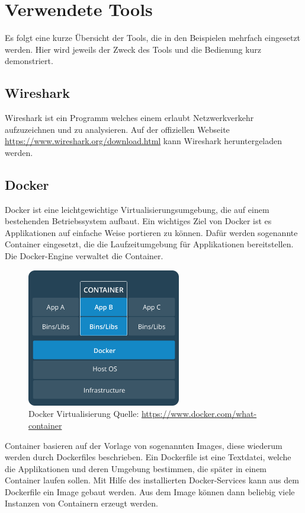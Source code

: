 \chapter{Verwendete Tools}
Es folgt eine kurze Übersicht der Tools, die in den Beispielen mehrfach eingesetzt werden. Hier wird jeweils der Zweck des Tools und die Bedienung kurz demonstriert.


\section{Wireshark}

Wireshark ist ein Programm welches einem erlaubt Netzwerkverkehr aufzuzeichnen und zu analysieren.
Auf der offiziellen Webseite \url{https://www.wireshark.org/download.html} kann Wireshark heruntergeladen werden.

\section{Docker}
Docker ist eine leichtgewichtige Virtualisierungsumgebung, die auf einem bestehenden Betriebssystem aufbaut. Ein wichtiges Ziel von Docker ist es Applikationen auf einfache Weise portieren zu können. Dafür werden sogenannte Container eingesetzt, die die Laufzeitumgebung für Applikationen bereitstellen. Die Docker-Engine verwaltet die Container.

\begin{figure}[H]
	\centering
    \includegraphics[width=0.6\textwidth]{images/tools/docker_schichten_architektur}
    \caption{Docker Virtualisierung Quelle: \url{https://www.docker.com/what-container}}
    \label{img:tools_docker_virtualisierung}
\end{figure}

Container basieren auf der Vorlage von sogenannten Images, diese wiederum werden durch Dockerfiles beschrieben.
Ein Dockerfile ist eine Textdatei, welche die Applikationen und deren Umgebung bestimmen, die später in einem Container laufen sollen.
Mit Hilfe des installierten Docker-Services kann aus dem Dockerfile ein Image gebaut werden.
Aus dem Image können dann beliebig viele Instanzen von Containern erzeugt werden.

